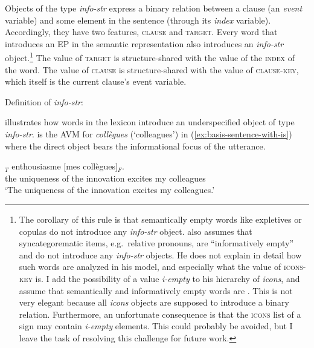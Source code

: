 Objects of the type \emph{info-str} express a binary relation between a clause (an \emph{event} variable) and some element in the sentence (through its \emph{index} variable). Accordingly, they have two features, \textsc{clause} and \textsc{target}. Every word that introduces an EP in the semantic representation also introduces an \emph{info-str} object.\footnote{The corollary of this rule is that semantically empty words like expletives or copulas do not introduce any \emph{info-str} object. \citet[112]{Song.2017} also assumes that syncategorematic items, e.g.\ relative pronouns, are ``informatively empty'' and do not introduce any \emph{info-str} objects. He does not explain in detail how such words are analyzed in his model, and especially what the value of \textsc{icons-key} is. 
I add the possibility of a value \emph{i-empty} to his hierarchy of \emph{icons}, and assume that semantically and informatively empty words are . This is not very elegant because all \emph{icons} objects are supposed to introduce a binary relation. Furthermore, an unfortunate consequence is that the \textsc{icons} list of a sign may contain  \emph{i-empty} elements. This could probably be avoided, but I leave the task of resolving this challenge for future work.
} 
The value of \textsc{target} is structure-shared with the value of the \textsc{index} of the word. The value of \textsc{clause} is structure-shared with the value of \textsc{clause-key}, which itself is the current clause's event variable.

\ea Definition of \emph{info-str}: \nopagebreak

\label{avm:def-infostr}
\z 

 illustrates how words in the lexicon introduce an underspecified object of type \emph{info-str}.  is the AVM for \emph{collègues} (`colleagues') in (\ref{ex:basis-sentence-with-is}) where the direct object bears the informational focus of the utterance.

\ea
{}$_T$ enthousiasme [mes collègues]$_F$.\\
\sbar{}the uniqueness of the innovation excites \sbar{}my colleagues\\
\glt `The uniqueness of the innovation excites my colleagues.'
\label{ex:basis-sentence-with-is}
\z

